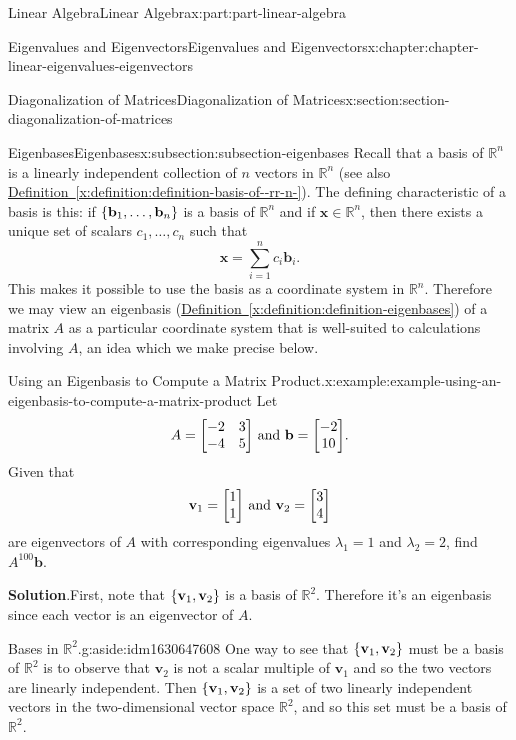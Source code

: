 \documentclass[twoside,10pt,]{book}
\newcommand{\blocktitlefont}{\relax}
\newcommand{\xreffont}{\relax}
\numberwithin{equation}{part}
\newcommand{\RR}{\mathbb{R}}
\providecommand{\vb}[1]{\mathbf{#1}}
\newcommand{\xx}{\mathbf{x}}
\newcommand{\vv}{\mathbf{v}}
\newcommand{\bb}{\mathbf{b}}
\begin{document}
\begin{partptx}{Linear Algebra}{}{Linear Algebra}{}{}{x:part:part-linear-algebra}
\begin{chapterptx}{Eigenvalues and Eigenvectors}{}{Eigenvalues and Eigenvectors}{}{}{x:chapter:chapter-linear-eigenvalues-eigenvectors}
\begin{sectionptx}{Diagonalization of Matrices}{}{Diagonalization of Matrices}{}{}{x:section:section-diagonalization-of-matrices}
\begin{introduction}{}
\end{introduction}%
%
%
\typeout{************************************************}
\typeout{************************************************}
%
\begin{subsectionptx}{Eigenbases}{}{Eigenbases}{}{}{x:subsection:subsection-eigenbases}
Recall that a basis of \(\RR^n\) is a linearly independent collection of \(n\) vectors in \(\RR^n\) (see also \hyperref[x:definition:definition-basis-of--rr-n-]{Definition~{\xreffont\ref{x:definition:definition-basis-of--rr-n-}}}). The defining characteristic of a basis is this: if \(\qty{\vb{b}_1,\ldots,\vb{b}_n}\) is a basis of \(\RR^n\) and if \(\vb{x}\in\RR^n\), then there exists a unique set of scalars \(c_1,\ldots,c_n\) such that%
\begin{equation*}
\xx = \sum_{i=1}^{n}c_i\vb{b}_i\text{.}
\end{equation*}
This makes it possible to use the basis as a coordinate system in \(\RR^n\). Therefore we may view an eigenbasis (\hyperref[x:definition:definition-eigenbases]{Definition~{\xreffont\ref{x:definition:definition-eigenbases}}}) of a matrix \(A\) as a particular coordinate system that is well-suited to calculations involving \(A\), an idea which we make precise below.%
\begin{example}{Using an Eigenbasis to Compute a Matrix Product.}{x:example:example-using-an-eigenbasis-to-compute-a-matrix-product}%
Let%
\begin{equation*}
A = \mqty[-2 & 3 \\ -4 & 5]\text{ and }\vb{b} = \mqty[-2 \\ 10]\text{.}
\end{equation*}
Given that%
\begin{equation*}
\vv_1 = \mqty[1\\1]\text{ and }\vv_2 = \mqty[3\\4]
\end{equation*}
are eigenvectors of \(A\) with corresponding eigenvalues \(\lambda_1 = 1\) and \(\lambda_2 = 2\), find \(A^{100}\bb\).%
\par\smallskip%
\noindent\textbf{\blocktitlefont Solution}.\hypertarget{g:solution:idm1630641976}{}\quad{}First, note that \(\qty{\vv_1,\vv_2}\) is a basis of \(\RR^2\). Therefore it's an eigenbasis since each vector is an eigenvector of \(A\). \begin{aside}{Bases in \(\RR^2\).}{g:aside:idm1630647608}%
One way to see that \(\qty{\vv_1,\vv_2}\) must be a basis of \(\RR^2\) is to observe that \(\vv_2\) is not a scalar multiple of \(\vv_1\) and so the two vectors are linearly independent. Then \(\qty{\vv_1,\vv_2}\) is a set of two linearly independent vectors in the two-dimensional vector space \(\RR^2\), and so this set must be a basis of \(\RR^2\).%

\end{aside}
\end{example}
\end{subsectionptx}
\end{sectionptx}
\end{chapterptx}
\end{partptx}
\end{document}
